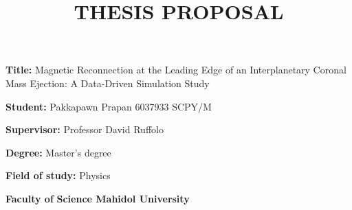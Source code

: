 \documentclass[12pt, a4paper]{article}
\title{THESIS PROPOSAL}
\author{}
\date{}
\newcommand{\namelistlabel}[1]{\mbox{#1}\hfil}
\newenvironment{namelist}[1]{%
\begin{list}{}
    {
        \let\makelabel\namelistlabel
        \settowidth{\labelwidth}{#1}
        \setlength{\leftmargin}{1.1\labelwidth}
    }
  }{%
\end{list}}
\begin{document}
\maketitle

\begin{namelist}{xxxxxxxxxxxx}
\item[{\bf Title:}]
	Magnetic Reconnection at the Leading Edge of an Interplanetary Coronal Mass Ejection: A Data-Driven Simulation Study
\item[{\bf Student:}]
	Pakkapawn Prapan 6037933 SCPY/M
\item[{\bf Supervisor:}]
	Professor David Ruffolo
\item[{\bf Degree:}]
	Master's degree
\item[{\bf Field of study:}]
	Physics
\item[{\bf Faculty of}]
	\bf Science \qquad \bf Mahidol University 
\end{namelist}
\end{document}
